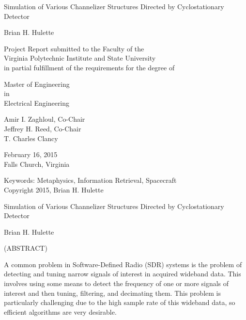 \documentclass[12pt,dvips]{report}
\begin{document}
\thispagestyle{empty}
\begin{center}

{\large
Simulation of Various Channelizer Structures 
Directed by Cyclostationary Detector}

\vfill

Brian H. Hulette

\vfill

Project Report submitted to the Faculty of the \\
Virginia Polytechnic Institute and State University \\
in partial fulfillment of the requirements for the degree of

\vfill

Master of Engineering \\
in \\
Electrical Engineering

\vfill

Amir I. Zaghloul, Co-Chair \\
Jeffrey H. Reed, Co-Chair \\
T. Charles Clancy

\vfill

February 16, 2015 \\
Falls Church, Virginia

\vfill

Keywords: Metaphysics, Information Retrieval, Spacecraft
\\
Copyright 2015, Brian H. Hulette

\end{center}

\pagebreak

\thispagestyle{empty}
\begin{center}

{\large Simulation of Various Channelizer Structures 
Directed by Cyclostationary Detector}

\vfill

Brian H. Hulette

\vfill

(ABSTRACT)

\vfill

\end{center}

A common problem in Software-Defined Radio (SDR) systems is the problem of
detecting and tuning narrow signals of interest in acquired wideband data. This
involves using some means to detect the frequency of one or more signals of
interest and then tuning, filtering, and decimating them. This problem is
particularly challenging due to the high sample rate of this wideband data,
so efficient algorithms are very desirable.
\end{document}
